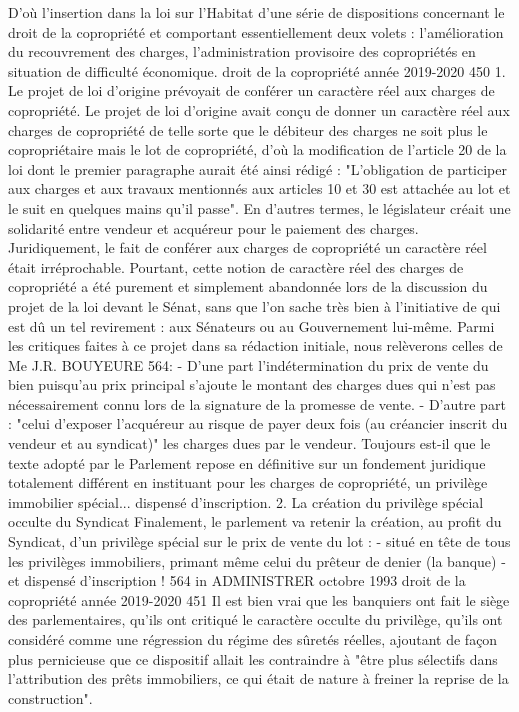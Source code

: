 D'où l'insertion dans la loi sur l'Habitat d'une série de dispositions concernant le droit de la copropriété et comportant essentiellement deux volets :
l'amélioration du recouvrement des charges,
l'administration provisoire des copropriétés en situation de difficulté économique.
droit de la copropriété année 2019-2020
450
1. Le projet de loi d'origine prévoyait de conférer un caractère réel aux charges de copropriété.
Le projet de loi d'origine avait conçu de donner un caractère réel aux charges de copropriété de telle sorte que le débiteur des charges ne soit plus le copropriétaire mais le lot de copropriété, d'où la modification de l'article 20 de la loi dont le premier paragraphe aurait été ainsi rédigé :
"L'obligation de participer aux charges et aux travaux mentionnés aux articles 10 et 30 est attachée au lot et le suit en quelques mains qu'il passe".
En d'autres termes, le législateur créait une solidarité entre vendeur et acquéreur pour le paiement des charges.
Juridiquement, le fait de conférer aux charges de copropriété un caractère réel était irréprochable.
Pourtant, cette notion de caractère réel des charges de copropriété a été purement et simplement abandonnée lors de la discussion du projet de la loi devant le Sénat, sans que l'on sache très bien à l'initiative de qui est dû un tel revirement : aux Sénateurs ou au Gouvernement lui-même.
Parmi les critiques faites à ce projet dans sa rédaction initiale, nous relèverons celles de Me J.R. BOUYEURE 564:
- D'une part l'indétermination du prix de vente du bien puisqu'au prix principal s'ajoute le montant des charges dues qui n'est pas nécessairement connu lors de la signature de la promesse de vente.
- D'autre part : "celui d'exposer l'acquéreur au risque de payer deux fois (au créancier inscrit du vendeur et au syndicat)" les charges dues par le vendeur.
Toujours est-il que le texte adopté par le Parlement repose en définitive sur un fondement juridique totalement différent en instituant pour les charges de copropriété, un privilège immobilier spécial... dispensé d'inscription.
2. La création du privilège spécial occulte du Syndicat
Finalement, le parlement va retenir la création, au profit du Syndicat, d’un privilège spécial sur le prix de vente du lot :
- situé en tête de tous les privilèges immobiliers, primant même celui du prêteur de denier (la banque)
- et dispensé d’inscription !
564 in ADMINISTRER octobre 1993
droit de la copropriété année 2019-2020
451
Il est bien vrai que les banquiers ont fait le siège des parlementaires, qu'ils ont critiqué le caractère occulte du privilège, qu'ils ont considéré comme une régression du régime des sûretés réelles, ajoutant de façon plus pernicieuse que ce dispositif allait les contraindre à "être plus sélectifs dans l'attribution des prêts immobiliers, ce qui était de nature à freiner la reprise de la construction".

